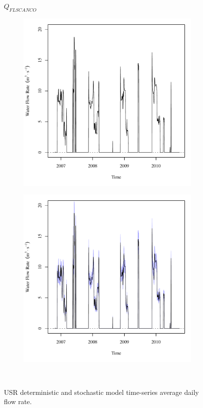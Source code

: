 \subfiguremid
\begin{landscape}
	\begin{figure}
		\centering
		$ Q_{FLSCANCO} $
		\begin{subfigure}{0.7\textwidth}
			\centering
			\includegraphics[width=\tableCustomSize]{"Figures/Results_USR/Deterministic/Q FLS"}
		\end{subfigure}%
		\begin{subfigure}{0.7\textwidth}
			\centering
			\includegraphics[width=\tableCustomSize]{"Figures/Results_USR/Stochastic/Q FLS"}
		\end{subfigure}\\
		\caption{USR deterministic and stochastic model time-series average daily flow rate.}
	\end{figure}
\end{landscape}
